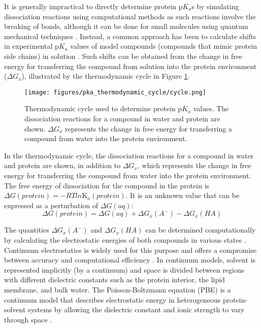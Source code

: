 It is generally impractical to directly determine protein p$K_a$s by simulating dissociation reactions using computational methods as such reactions involve the breaking of bonds, although it can be done for small molecules using quantum mechanical techniques \cite{AguilellaArzo:2010p10956,Bashford:2004p10958}. Instead, a common approach has been to calculate shifts in experimental p$K_a$ values of model compounds (compounds that mimic protein side chains) in solution \cite{Nielsen:2001p10773}. Such shifts can be obtained from the change in free energy for transferring the compound from solution into the protein environment ($\Delta G_x$), illustrated by the thermodynamic cycle in Figure \ref{fig:acid_cycle}. 
\begin{figure}[htbp]
\centering
\texttt{[image: figures/pka\_thermodynamic\_cycle/cycle.png]}
\caption[Thermodynamic cycle used to determine protein p$K_a$ values.]{Thermodynamic cycle used to determine protein p$K_a$ values. The dissociation reactions for a compound in water and protein are shown. $\Delta G_x$ represents the change in free energy for transferring a compound from water into the protein environment.}
\label{fig:acid_cycle}
\end{figure}
In the thermodynamic cycle, the dissociation reactions for a compound in water and protein are shown, in addition to $\Delta G_x$, which represents the change in free energy for transferring the compound from water into the protein environment. The free energy of dissociation for the compound in the protein is $\Delta G (protein) = -RTln\mbox{K}_a (protein)$. It is an unknown value that can be expressed as a perturbation of $\Delta G (aq)$:
\begin{equation}
\Delta G(protein) = \Delta G(aq) + \Delta G_x(A^-) - \Delta G_x(HA)
\end{equation}

The quantities $\Delta G_x(A^-)$ and $\Delta G_x(HA)$ can be determined computationally by calculating the electrostatic energies of both compounds in various states \cite{Bashford:2004p10958}. Continuum electrostatics is widely used for this purpose and offers a compromise between accuracy and computational efficiency \cite{Gilson:1991p10947,Bashford:2004p10958}. In continuum models, solvent is represented implicitly (by a continuum) and space is divided between regions with different dielectric constants such as the protein interior, the lipid membrane, and bulk water. The Poisson-Boltzmann equation (PBE) is a continuum model that describes electrostatic energy in heterogeneous protein-solvent systems by allowing the dielectric constant and ionic strength to vary through space \cite{Gilson:1988p10954}.

